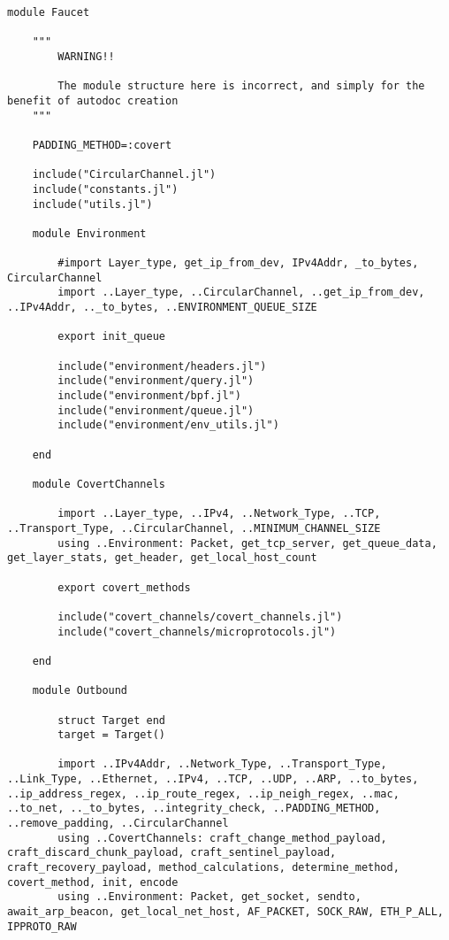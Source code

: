 \begin{lstlisting}[language=JuliaLocal, style=julia]
module Faucet

    """
        WARNING!!

        The module structure here is incorrect, and simply for the benefit of autodoc creation
    """

    PADDING_METHOD=:covert

    include("CircularChannel.jl")
    include("constants.jl")
    include("utils.jl")

    module Environment

        #import Layer_type, get_ip_from_dev, IPv4Addr, _to_bytes, CircularChannel
        import ..Layer_type, ..CircularChannel, ..get_ip_from_dev, ..IPv4Addr, .._to_bytes, ..ENVIRONMENT_QUEUE_SIZE

        export init_queue

        include("environment/headers.jl")
        include("environment/query.jl")
        include("environment/bpf.jl")
        include("environment/queue.jl")
        include("environment/env_utils.jl")

    end

    module CovertChannels

        import ..Layer_type, ..IPv4, ..Network_Type, ..TCP, ..Transport_Type, ..CircularChannel, ..MINIMUM_CHANNEL_SIZE
        using ..Environment: Packet, get_tcp_server, get_queue_data, get_layer_stats, get_header, get_local_host_count

        export covert_methods

        include("covert_channels/covert_channels.jl")
        include("covert_channels/microprotocols.jl")
        
    end

    module Outbound

        struct Target end
        target = Target()

        import ..IPv4Addr, ..Network_Type, ..Transport_Type, ..Link_Type, ..Ethernet, ..IPv4, ..TCP, ..UDP, ..ARP, ..to_bytes, ..ip_address_regex, ..ip_route_regex, ..ip_neigh_regex, ..mac, ..to_net, .._to_bytes, ..integrity_check, ..PADDING_METHOD, ..remove_padding, ..CircularChannel
        using ..CovertChannels: craft_change_method_payload, craft_discard_chunk_payload, craft_sentinel_payload, craft_recovery_payload, method_calculations, determine_method, covert_method, init, encode
        using ..Environment: Packet, get_socket, sendto, await_arp_beacon, get_local_net_host, AF_PACKET, SOCK_RAW, ETH_P_ALL, IPPROTO_RAW


\end{lstlisting}
